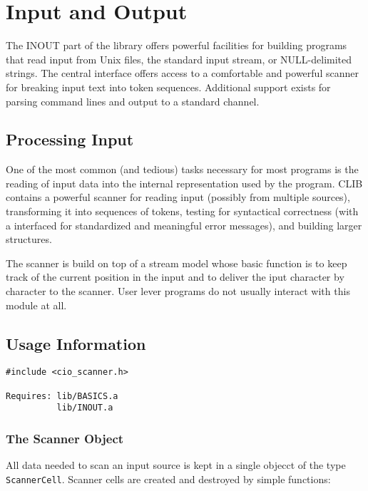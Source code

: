 
\section{Input and Output}
\label{sec:io}

The INOUT part of the library offers powerful facilities for building
programs that read input from Unix files, the standard input stream,
or NULL-delimited strings. The central interface offers access to a
comfortable and powerful scanner for breaking input text into token
sequences. Additional support exists for parsing command lines and
output to a standard channel.

\subsection{Processing Input}
\label{sec:io:input}

One of the most common (and tedious) tasks necessary for most programs
is the reading of input data into the internal representation used by
the program. CLIB contains a powerful scanner for reading input
(possibly from multiple sources), transforming it into sequences of
tokens, testing for syntactical correctness (with a interfaced for
standardized and meaningful error messages), and building larger
structures.

The scanner is build on top of a stream model whose basic function is
to keep track of the current position in the input and to deliver the
iput character by character to the scanner. User lever programs do not
usually interact with this module at all.


\subsection{Usage Information}

\begin{verbatim}
#include <cio_scanner.h>

Requires: lib/BASICS.a
          lib/INOUT.a
\end{verbatim}


\subsubsection{The Scanner Object}

All data needed to scan an input source is kept in a single objecct of
the type \texttt{ScannerCell}. Scanner cells are created and destroyed
by simple functions:

